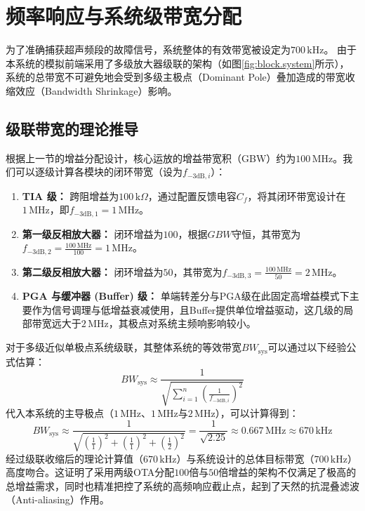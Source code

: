 \section{频率响应与系统级带宽分配}
为了准确捕获超声频段的故障信号，系统整体的有效带宽被设定为$700\,\text{kHz}$。
由于本系统的模拟前端采用了多级放大器级联的架构（如图\ref{fig:block.system}所示），
系统的总带宽不可避免地会受到多级主极点（Dominant Pole）叠加造成的带宽收缩效应（Bandwidth Shrinkage）影响。

\subsection{级联带宽的理论推导}
根据上一节的增益分配设计，核心运放的增益带宽积（GBW）约为$100\,\text{MHz}$。我们可以逐级计算各模块的闭环带宽（设为$f_{-3\text{dB}, i}$）：
\begin{enumerate}
    \item \textbf{TIA 级：} 跨阻增益为$100\,\text{k}\Omega$，通过配置反馈电容$C_f$，将其闭环带宽设计在$1\,\text{MHz}$，即$f_{-3\text{dB}, 1} = 1\,\text{MHz}$。
    \item \textbf{第一级反相放大器：} 闭环增益为$100$，根据$GBW$守恒，其带宽为$f_{-3\text{dB}, 2} = \frac{100\,\text{MHz}}{100} = 1\,\text{MHz}$。
    \item \textbf{第二级反相放大器：} 闭环增益为$50$，其带宽为$f_{-3\text{dB}, 3} = \frac{100\,\text{MHz}}{50} = 2\,\text{MHz}$。
    \item \textbf{PGA 与缓冲器 (Buffer) 级：} 单端转差分与PGA级在此固定高增益模式下主要作为信号调理与低增益衰减使用，且Buffer提供单位增益驱动，这几级的局部带宽远大于$2\,\text{MHz}$，其极点对系统主频响影响较小。
\end{enumerate}

对于多级近似单极点系统级联，其整体系统的等效带宽$BW_{\text{sys}}$可以通过以下经验公式估算：
\begin{equation}
    BW_{\text{sys}} \approx \frac{1}{\sqrt{\sum_{i=1}^{n} \left(\frac{1}{f_{-3\text{dB}, i}}\right)^2}}
\end{equation}
代入本系统的主导极点（$1\,\text{MHz}$、$1\,\text{MHz}$与$2\,\text{MHz}$），可以计算得到：
\begin{equation}
    BW_{\text{sys}} \approx \frac{1}{\sqrt{\left(\frac{1}{1}\right)^2 + \left(\frac{1}{1}\right)^2 + \left(\frac{1}{2}\right)^2}} = \frac{1}{\sqrt{2.25}} \approx 0.667\,\text{MHz} \approx 670\,\text{kHz}
\end{equation}
经过级联收缩后的理论计算值（$670\,\text{kHz}$）与系统设计的总体目标带宽（$700\,\text{kHz}$）高度吻合。这证明了采用两级OTA分配$100$倍与$50$倍增益的架构不仅满足了极高的总增益需求，同时也精准把控了系统的高频响应截止点，起到了天然的抗混叠滤波（Anti-aliasing）作用。

